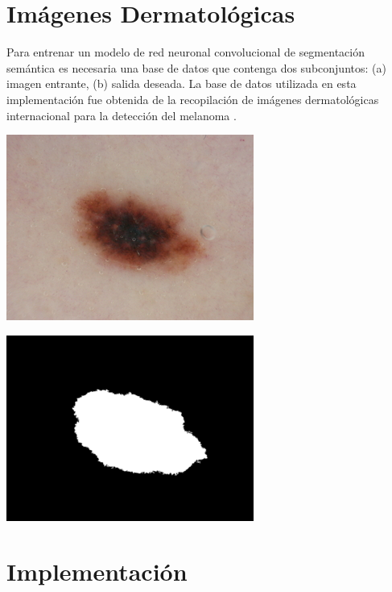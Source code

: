 \documentclass[a0,portrait]{a0poster}
\begin{document}
\begin{multicols}{3}
\section*{Imágenes Dermatológicas}
Para entrenar un modelo de red neuronal convolucional de segmentación semántica es necesaria una base de datos que contenga dos subconjuntos: (a) imagen entrante, (b) salida deseada. La base de datos utilizada en esta implementación fue obtenida de la recopilación de imágenes dermatológicas internacional para la detección del melanoma \citep{isic_skin}.

\vspace{2cm}
\begin{center}
    \includegraphics[scale=0.5]{input_1.png}
\end{center}

\begin{center}
    \includegraphics[scale=0.5]{mask_1.png}
\end{center}

\section*{Implementación}


\end{multicols}
\end{document}
